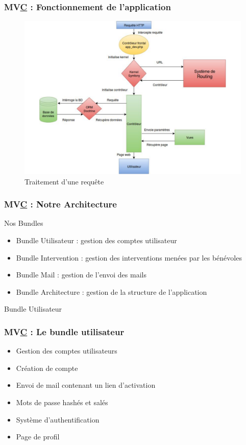 
\begin{frame}
  \frametitle{MV\underline{C} : Fonctionnement de l'application}
        \begin{figure}[!h]
	\begin{center}
	\includegraphics[scale=0.3]{images/symfony}
	\caption{Traitement d'une requête}
	\end{center}
\end{figure}
\end{frame}


\begin{frame}
  \frametitle{MV\underline{C} : Notre Architecture}
  \begin{block}{Nos Bundles}
  \begin{itemize}
  \item Bundle Utilisateur : gestion des comptes utilisateur
  \item Bundle Intervention : gestion des interventions menées par les bénévoles
  \item Bundle Mail : gestion de l'envoi des mails
  \item Bundle Architecture : gestion de la structure de l'application
  \end{itemize}
  \end{block}   
  \end{frame}


\begin{frame}
\begin{block}{Bundle Utilisateur}
\frametitle{MV\underline{C} : Le bundle utilisateur}
\begin{itemize}
\item Gestion des comptes utilisateurs
\item Création de compte
\item Envoi de mail contenant un lien d'activation
\item Mots de passe hashés et salés
\item Système d'authentification
\item Page de profil 
\end{itemize}
\end{block}
\end{frame}
